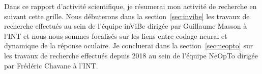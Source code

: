 Dans ce rapport d'activité scientifique, je résumerai mon activité de recherche en suivant cette grille. Nous débuterons %
dans la section~\ref{sec:invibe} les travaux de recherche effectués au sein de l'équipe {\sc inViBe} dirigée par Guillaume Masson à l'INT et nous nous sommes focalisés sur les liens entre codage neural et dynamique de la réponse oculaire. %
Je concluerai dans la section~\ref{sec:neopto} sur les travaux de recherche effectués depuis 2018 au sein de l'équipe {\sc NeOpTo} dirigée par Frédéric Chavane à l'INT.
